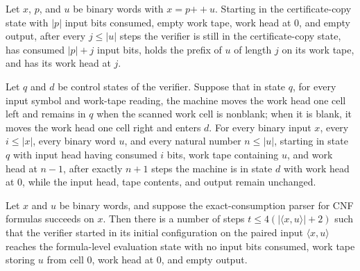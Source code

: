 \begin{lemma}
\label{Complexity.taut_copy_run}
\leanok
{}
Let $x$, $p$, and $u$ be binary words with $x=p\mathbin{+\!\!+}u$. Starting in the
certificate-copy state with $|p|$ input bits consumed, empty work tape, work head at
$0$, and empty output, after every $j\le |u|$ steps the verifier is still in the
certificate-copy state, has consumed $|p|+j$ input bits, holds the prefix of $u$ of
length $j$ on its work tape, and has its work head at $j$.
\end{lemma}

\begin{lemma}
\label{Complexity.taut_work_rewind}
\leanok
{}
Let $q$ and $d$ be control states of the verifier. Suppose that in state $q$, for every
input symbol and work-tape reading, the machine moves the work head one cell left and
remains in $q$ when the scanned work cell is nonblank; when it is blank, it moves the
work head one cell right and enters $d$. For every binary input $x$, every $i\le |x|$,
every binary word $u$, and every natural number $n\le |u|$, starting in state $q$ with
input head having consumed $i$ bits, work tape containing $u$, and work head at $n-1$,
after exactly $n+1$ steps the machine is in state $d$ with work head at $0$, while the
input head, tape contents, and output remain unchanged.
\end{lemma}

\begin{lemma}
\label{Complexity.taut_evaluation_start}
\leanok
{}
Let $x$ and $u$ be binary words, and suppose the exact-consumption parser for CNF
formulas succeeds on $x$. Then there is a number of steps $t\le 4(|\langle
x,u\rangle|+2)$ such that the verifier started in its initial configuration on the
paired input $\langle x,u\rangle$ reaches the formula-level evaluation state with no
input bits consumed, work tape storing $u$ from cell $0$, work head at $0$, and empty
output.
\end{lemma}


